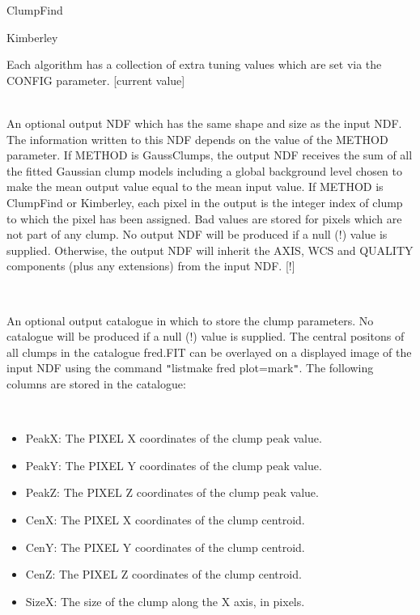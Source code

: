 \documentclass[twoside,11pt]{article}
\renewcommand{\_}{\texttt{\symbol{95}}}
\newcommand{\sstsubsection}[1]{ \item[{#1}] \mbox{} \\}
\newcommand{\sstitemlist}[1]{
  \mbox{} \\
  \vspace{-3.5ex}
  \begin{itemize}
     #1
  \end{itemize}
}
\newcommand{\sstitem}{\item}
\newcommand{\sstsubsection}[1]{\item[{#1}]}
\newcommand{\sstitemlist}[1]{
      \begin{itemize}
         #1
      \end{itemize}
      \\
   }
\newcommand{\sstitem}{\item}
\begin{document}
{{{{            \sstitem
            ClumpFind

            \sstitem
            Kimberley

         }
         Each algorithm has a collection of extra tuning values which are
         set via the CONFIG parameter.   [current value]
      }
      \sstsubsection{
         OUT = NDF (Write)
      }{
         An optional output NDF which has the same shape and size as the
         input NDF. The information written to this NDF depends on the value
         of the METHOD parameter. If METHOD is GaussClumps, the output NDF
         receives the sum of all the fitted Gaussian clump models including
         a global background level chosen to make the mean output value
         equal to the mean input value. If METHOD is ClumpFind or Kimberley,
         each pixel in
         the output is the integer index of clump to which the pixel has been
         assigned. Bad values are stored for pixels which are not part of
         any clump. No output NDF will be produced if a null (!) value is
         supplied. Otherwise, the output NDF will inherit the AXIS, WCS and
         QUALITY components (plus any extensions) from the input NDF. [!]
      }
      \sstsubsection{
         OUTCAT = FILENAME (Write)
      }{
         An optional output catalogue in which to store the clump parameters.
         No catalogue will be produced if a null (!) value is supplied.
         The central positons of all clumps in the catalogue fred.FIT can be
         overlayed on a displayed image of the input NDF using the command
         {\tt "}listmake fred plot=mark{\tt "}. The following columns are stored in
         the catalogue:

         \sstitemlist{

            \sstitem
            PeakX: The PIXEL X coordinates of the clump peak value.

            \sstitem
            PeakY: The PIXEL Y coordinates of the clump peak value.

            \sstitem
            PeakZ: The PIXEL Z coordinates of the clump peak value.

            \sstitem
            CenX: The PIXEL X coordinates of the clump centroid.

            \sstitem
            CenY: The PIXEL Y coordinates of the clump centroid.

            \sstitem
            CenZ: The PIXEL Z coordinates of the clump centroid.

            \sstitem
            SizeX: The size of the clump along the X axis, in pixels.

}}}}
\end{document}
